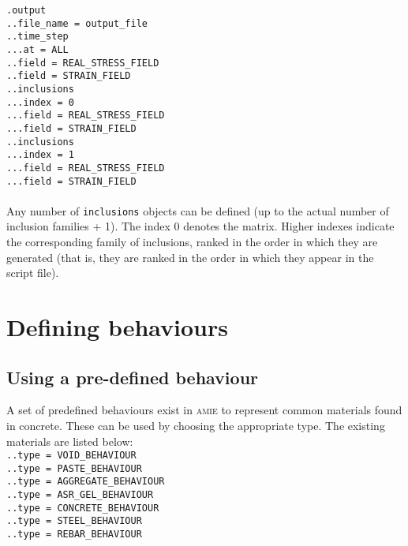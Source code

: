\documentclass[10pt]{article}
\begin{document}
\verb+.output+\\
\verb+..file_name = output_file+\\
\verb+..time_step+\\
\verb+...at = ALL+\\
\verb+..field = REAL_STRESS_FIELD+\\
\verb+..field = STRAIN_FIELD+\\
\verb+..inclusions+\\
\verb+...index = 0+\\
\verb+...field = REAL_STRESS_FIELD+\\
\verb+...field = STRAIN_FIELD+\\
\verb+..inclusions+\\
\verb+...index = 1+\\
\verb+...field = REAL_STRESS_FIELD+\\
\verb+...field = STRAIN_FIELD+

\paragraph{} Any number of \verb+inclusions+ objects can be defined (up to the actual number of inclusion families + 1). The index 0 denotes the matrix. Higher indexes indicate the corresponding family of inclusions, ranked in the order in which they are generated (that is, they are ranked in the order in which they appear in the script file).



\section{Defining behaviours}

\subsection{Using a pre-defined behaviour}

A set of predefined behaviours exist in \textsc{amie} to represent common materials found in concrete. These can be used by choosing the appropriate type. The existing materials are listed below:\\

\noindent \verb+..type = VOID_BEHAVIOUR+\\
\verb+..type = PASTE_BEHAVIOUR+\\
\verb+..type = AGGREGATE_BEHAVIOUR+\\
\verb+..type = ASR_GEL_BEHAVIOUR+\\
\verb+..type = CONCRETE_BEHAVIOUR+\\
\verb+..type = STEEL_BEHAVIOUR+\\
\verb+..type = REBAR_BEHAVIOUR+
\end{document}
